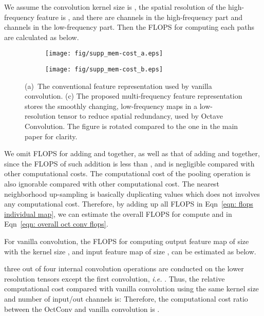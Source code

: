 \documentclass[10pt,twocolumn,letterpaper]{article}
\newcommand{\hiConv}[0]{OctConv\xspace}
\newcommand{\hiConvName}[0]{Octave Convolution\xspace}
\begin{document}
We assume the convolution kernel size is , the spatial resolution of the high-frequency feature is , and there are   channels in the high-frequency part  and  channels in the low-frequency part. Then the FLOPS for computing each paths are calculated as below.


\begin{figure}[t!]
    \centering
    \begin{subfigure}[b]{0.4\columnwidth}
      \texttt{[image: fig/supp\_mem-cost\_a.eps]}
      \caption{}
      \label{sup:fig:teaser_a}
    \end{subfigure}
    \hspace{18pt}
    \begin{subfigure}[b]{.5\columnwidth}
      \texttt{[image: fig/supp\_mem-cost\_b.eps]}
      \caption{}
      \label{sup:fig:teaser_b}
    \end{subfigure}
    \caption{(a)~The conventional feature representation used by vanilla convolution. (c) The proposed multi-frequency feature representation stores the smoothly changing, low-frequency maps in a low-resolution tensor to reduce spatial redundancy, used by \hiConvName. The figure is rotated compared to the one in the main paper for clarity.}
    \label{sup:fig:teaser}
    
  \end{figure}


We omit FLOPS for adding  and  together, as well as that of adding  and  together, since the FLOPS of such addition is less than , and is negligible compared with other computational costs. The computational cost of the pooling operation is also ignorable compared with other computational cost. The nearest neighborhood up-sampling is basically duplicating values which does not involves any computational cost. Therefore, by adding up all FLOPS in Eqn~\ref{eqn: flops individual map}, we can estimate the overall FLOPS for compute  and  in Eqn~\ref{eqn: overall oct conv flops}. 



For vanilla convolution, the FLOPS for computing output feature map  of size  with the kernel size , and input feature map of size , can be estimated as below.



three out of four internal convolution operations are conducted on the lower resolution tensors except the first convolution, \emph{i.e.} . Thus, the relative computational cost compared with vanilla convolution using the same kernel size and number of input/out channels is:
Therefore, the computational cost ratio between the \hiConv and vanilla convolution is .
\end{document}
